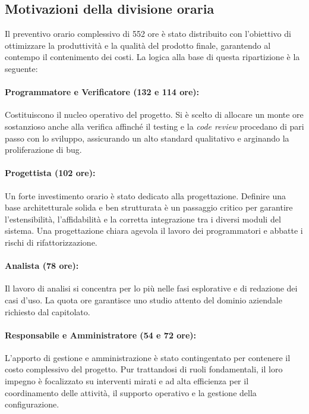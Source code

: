\documentclass[documento]{gpt}
\begin{document}
\subsection{Motivazioni della divisione oraria}
Il preventivo orario complessivo di 552 ore è stato distribuito con l'obiettivo di ottimizzare la produttività e la qualità del prodotto finale, garantendo al contempo il contenimento dei costi. La logica alla base di questa ripartizione è la seguente:

\paragraph{Programmatore e Verificatore (132 e 114 ore):} Costituiscono il nucleo operativo del progetto. Si è scelto di allocare un monte ore sostanzioso anche alla verifica affinché il testing e la \textit{code review} procedano di pari passo con lo sviluppo, assicurando un alto standard qualitativo e arginando la proliferazione di bug.

\paragraph{Progettista (102 ore):} Un forte investimento orario è stato dedicato alla progettazione. Definire una base architetturale solida e ben strutturata è un passaggio critico per garantire l'estensibilità, l'affidabilità e la corretta integrazione tra i diversi moduli del sistema. Una progettazione chiara agevola il lavoro dei programmatori e abbatte i rischi di rifattorizzazione.

\paragraph{Analista (78 ore):} Il lavoro di analisi si concentra per lo più nelle fasi esplorative e di redazione dei casi d'uso. La quota ore garantisce uno studio attento del dominio aziendale richiesto dal capitolato.

\paragraph{Responsabile e Amministratore (54 e 72 ore):} L'apporto di gestione e amministrazione è stato contingentato per contenere il costo complessivo del progetto. Pur trattandosi di ruoli fondamentali, il loro impegno è focalizzato su interventi mirati e ad alta efficienza per il coordinamento delle attività, il supporto operativo e la gestione della configurazione.
\end{document}
